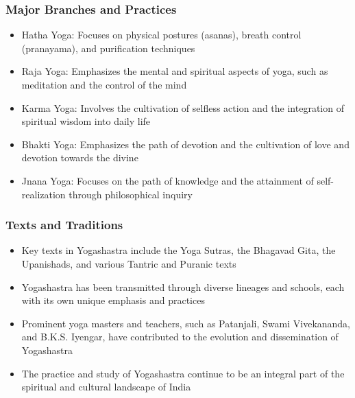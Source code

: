 \begin{frame}[fragile]\frametitle{Major Branches and Practices}
    \begin{itemize}
        \item Hatha Yoga: Focuses on physical postures (asanas), breath control (pranayama), and purification techniques
        \item Raja Yoga: Emphasizes the mental and spiritual aspects of yoga, such as meditation and the control of the mind
        \item Karma Yoga: Involves the cultivation of selfless action and the integration of spiritual wisdom into daily life
        \item Bhakti Yoga: Emphasizes the path of devotion and the cultivation of love and devotion towards the divine
        \item Jnana Yoga: Focuses on the path of knowledge and the attainment of self-realization through philosophical inquiry
    \end{itemize}
\end{frame}

\begin{frame}[fragile]\frametitle{Texts and Traditions}
    \begin{itemize}
        \item Key texts in Yogashastra include the Yoga Sutras, the Bhagavad Gita, the Upanishads, and various Tantric and Puranic texts
        \item Yogashastra has been transmitted through diverse lineages and schools, each with its own unique emphasis and practices
        \item Prominent yoga masters and teachers, such as Patanjali, Swami Vivekananda, and B.K.S. Iyengar, have contributed to the evolution and dissemination of Yogashastra
        \item The practice and study of Yogashastra continue to be an integral part of the spiritual and cultural landscape of India
    \end{itemize}
\end{frame}

